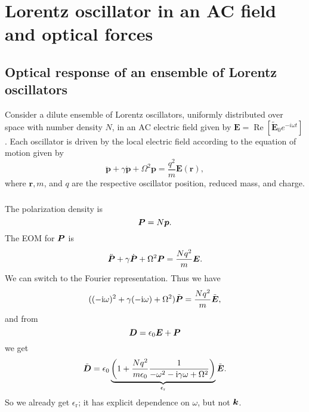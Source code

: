 \documentclass[hyperref, a4paper]{article}
\newcommand*{\ii}{\mathrm{i}}
\newcommand{\epsr}{\epsilon_{\text{r}}}
\newcommand{\Efreq}{\tilde{\vb*{E}}}
\newcommand{\Dfreq}{\tilde{\vb*{D}}}
\begin{document}
\section{Lorentz oscillator in an AC field and optical forces}

\subsection{Optical response of an ensemble of Lorentz oscillators}

Consider a dilute ensemble of Lorentz oscillators, uniformly distributed over space with number density $N$, in an $\mathrm{AC}$ electric field given by $\mathbf{E}=\operatorname{Re}\left[\tilde{\mathbf{E}}_0 e^{-i \omega t}\right]$. Each oscillator is driven by the local electric field according to the equation of motion given by
$$
\ddot{\mathbf{p}}+\gamma \dot{\mathbf{p}}+\Omega^2 \mathbf{p}=\frac{q^2}{m} \mathbf{E}(\mathbf{r}),
$$
where $\mathbf{r}, m$, and $q$ are the respective oscillator position, reduced mass, and charge.

\subsubsection{}

The polarization density is 
\begin{equation}
    \vb*{P} = N \vb*{p}.
\end{equation}
The EOM for $\vb*{P}$ is 
\begin{equation}
    \ddot{\vb*{P}} + \gamma \dot{\vb*{P}} + \Omega^2 \vb*{P} = \frac{N q^2}{m} \vb*{E}.
\end{equation}
We can switch to the Fourier representation.
Thus we have 
\begin{equation}
    ((-\ii \omega)^2 + \gamma (- \ii \omega) + \Omega^2) \tilde{\vb*{P}} = \frac{N q^2}{m} \Efreq,
\end{equation}
and from 
\begin{equation}
    \vb*{D} = \epsilon_0 \vb*{E} + \vb*{P}
\end{equation}
we get 
\begin{equation}
    \Dfreq = \epsilon_0 \underbrace{\left(
        1 + \frac{N q^2}{m \epsilon_0} \frac{1}{- \omega^2 - \ii \gamma \omega + \Omega^2}
    \right)}_{\epsr} \Efreq.
\end{equation}
So we already get $\epsr$; it has explicit dependence on $\omega$,
but not $\vb*{k}$.

\subsubsection{}
\end{document}

